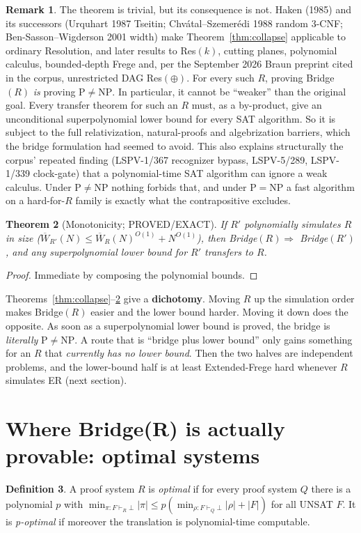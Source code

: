 \documentclass[11pt]{article}
\newtheorem{theorem}{Theorem}
\theoremstyle{definition}
\newtheorem{definition}[theorem]{Definition}
\newtheorem{remark}[theorem]{Remark}
\newcommand{\Wbar}{\overline W}
\begin{document}
\begin{remark}
The theorem is trivial, but its consequence is not. Haken (1985) and its successors (Urquhart 1987 Tseitin; Chv\'atal--Szemer\'edi 1988 random 3-CNF; Ben-Sasson--Wigderson 2001 width) make Theorem~\ref{thm:collapse} applicable to ordinary Resolution, and later results to Res$(k)$, cutting planes, polynomial calculus, bounded-depth Frege and, per the September 2026 Braun preprint cited in the corpus, unrestricted DAG Res$(\oplus)$. For every such $R$, proving Bridge$(R)$ \emph{is} proving $\mathrm P\ne\mathrm{NP}$. In particular, it cannot be ``weaker'' than the original goal. Every transfer theorem for such an $R$ must, as a by-product, give an unconditional superpolynomial lower bound for every SAT algorithm. So it is subject to the full relativization, natural-proofs and algebrization barriers, which the bridge formulation had seemed to avoid. This also explains structurally the corpus' repeated finding (LSPV-1/367 recognizer bypass, LSPV-5/289, LSPV-1/339 clock-gate) that a polynomial-time SAT algorithm can ignore a weak calculus. Under $\mathrm P\neq\mathrm{NP}$ nothing forbids that, and under $\mathrm P=\mathrm{NP}$ a fast algorithm on a hard-for-$R$ family is exactly what the contrapositive excludes.
\end{remark}

\begin{theorem}[Monotonicity; PROVED/EXACT]\label{thm:monotone}
If $R'$ polynomially simulates $R$ in size ($\Wbar_{R'}(N)\le \Wbar_R(N)^{O(1)}+N^{O(1)}$), then Bridge$(R)\Rightarrow$ Bridge$(R')$, and any superpolynomial lower bound for $R'$ transfers to $R$.
\end{theorem}
\begin{proof}Immediate by composing the polynomial bounds.\end{proof}

Theorems~\ref{thm:collapse}--\ref{thm:monotone} give a \textbf{dichotomy}. Moving $R$ up the simulation order makes Bridge$(R)$ easier and the lower bound harder. Moving it down does the opposite. As soon as a superpolynomial lower bound is proved, the bridge is \emph{literally} $\mathrm P\ne\mathrm{NP}$. A route that is ``bridge plus lower bound'' only gains something for an $R$ that \emph{currently has no lower bound}. Then the two halves are independent problems, and the lower-bound half is at least Extended-Frege hard whenever $R$ simulates ER (next section).

\section{Where Bridge(R) is actually provable: optimal systems}
\begin{definition}A proof system $R$ is \emph{optimal} if for every proof system $Q$ there is a polynomial $p$ with $\min_{\pi:F\vdash_R\bot}|\pi|\le p(\min_{\rho:F\vdash_Q\bot}|\rho|+|F|)$ for all UNSAT $F$. It is \emph{p-optimal} if moreover the translation is polynomial-time computable.\end{definition}
\end{document}
